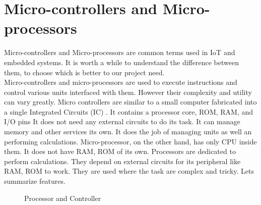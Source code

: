 \section{Micro-controllers and Micro-processors}
Micro-controllers and Micro-processors are common terms used in IoT and embedded systems. It is worth a while to understand the difference between them, to choose which is better to our project need.\\
Micro-controllers and micro-processors are used to execute instructions and control various units interfaced with them. However their complexity and utility can vary greatly. Micro controllers are similar to a small computer fabricated into a single Integrated Circuits (IC) . It contains a processor core, ROM, RAM, and I/O pins It does not need any external circuits to do its task. It can manage memory and other services its own. It does the job of managing units as well an performing calculations. Micro-processor, on the other hand, has only CPU inside them. It does not have RAM, ROM of its own. Processors are dedicated to perform calculations. They depend on external circuits for its peripheral like RAM, ROM to work. They are used where the task are complex and tricky. Lets summarize features.
\begin{figure}[htp]
  \centering
  \label{figure}
  \caption{Processor and Controller}
\end{figure}
